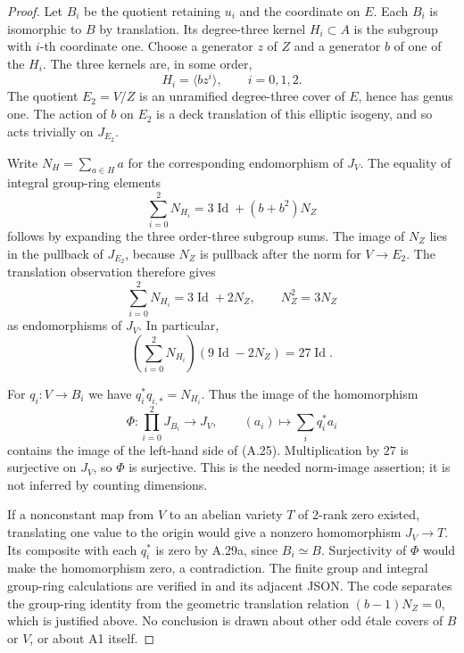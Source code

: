 \begin{proof}
Let $B_i$ be the quotient retaining $u_i$ and the coordinate
on $E$. Each $B_i$ is isomorphic to $B$ by translation.
Its degree-three kernel $H_i\subset A$ is the subgroup with
$i$-th coordinate one. Choose a generator $z$ of $Z$ and a
generator $b$ of one of the $H_i$. The three kernels are,
in some order,
\[
 H_i=\langle bz^i\rangle,\qquad i=0,1,2.
\]
The quotient $E_2=V/Z$ is an unramified degree-three cover
of $E$, hence has genus one. The action of $b$ on $E_2$ is
a deck translation of this elliptic isogeny, and so acts
trivially on $J_{E_2}$.

Write $N_H=\sum_{a\in H}a$ for the corresponding
endomorphism of $J_V$. The equality of integral group-ring
elements
\[
 \sum_{i=0}^2N_{H_i}=3\operatorname{Id}+(b+b^2)N_Z
\]
follows by expanding the three order-three subgroup sums.
The image of $N_Z$ lies in the pullback of $J_{E_2}$,
because $N_Z$ is pullback after the norm for $V\to E_2$.
The translation observation therefore gives
\[
 \sum_{i=0}^2N_{H_i}=3\operatorname{Id}+2N_Z,
 \qquad N_Z^2=3N_Z
\]
as endomorphisms of $J_V$. In particular,
\[
 \left(\sum_{i=0}^2N_{H_i}\right)
            (9\operatorname{Id}-2N_Z)=27\operatorname{Id}. \tag{A.25}
\]

For $q_i:V\to B_i$ we have
$q_i^*q_{i,*}=N_{H_i}$. Thus the image of the homomorphism
\[
 \Phi:\prod_{i=0}^2J_{B_i}\longrightarrow J_V,
                 \qquad (a_i)\longmapsto\sum_iq_i^*a_i
\]
contains the image of the left-hand side of (A.25).
Multiplication by $27$ is surjective on $J_V$, so $\Phi$
is surjective. This is the needed norm-image assertion;
it is not inferred by counting dimensions.

If a nonconstant map from $V$ to an abelian variety $T$ of
$2$-rank zero existed, translating one value to the origin
would give a nonzero homomorphism $J_V\to T$. Its composite
with each $q_i^*$ is zero by A.29a, since $B_i\simeq B$.
Surjectivity of $\Phi$ would make the homomorphism zero,
a contradiction. The finite group and integral group-ring
calculations are verified in
 and its
adjacent JSON. The code separates the group-ring identity
from the geometric translation relation $(b-1)N_Z=0$,
which is justified above. No conclusion is drawn about
other odd \'etale covers of $B$ or $V$, or about A1 itself.
\end{proof}

